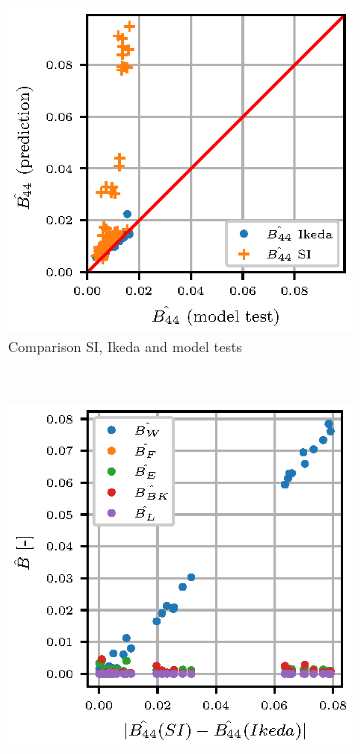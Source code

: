 \begin{figure}[H]
    \centering
    \begin{subfigure}[b]{0.485\textwidth}
        \centering
        \includegraphics[width=\textwidth]{figures/si_ikeda_model.eps}
        \caption{Comparison SI, Ikeda and model tests}
        \label{fig:si_ikeda_model}
    \end{subfigure}
    ~ %
    \begin{subfigure}[b]{0.485\textwidth}
        \centering
        \includegraphics[width=\textwidth]{figures/component_residual.eps}

\end{subfigure}
\end{figure}
